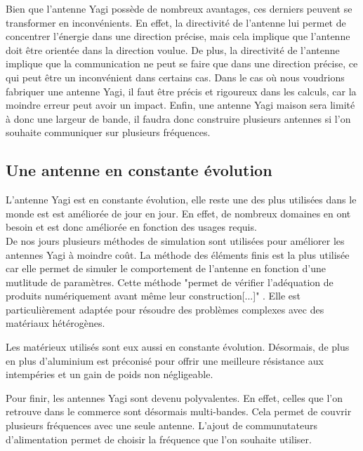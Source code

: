 \documentclass[12pt, a4paper]{article}
\begin{document}
Bien que l'antenne Yagi possède de nombreux avantages, ces derniers
peuvent se transformer en inconvénients. En effet, la directivité de l'antenne
lui permet de concentrer l'énergie dans une direction
précise, mais cela implique que l'antenne doit être
orientée dans la direction voulue. De plus, la directivité
de l'antenne implique que la communication ne peut se faire
que dans une direction précise, ce qui peut être un inconvénient
dans certains cas. Dans le cas où nous voudrions fabriquer
une antenne Yagi, il faut être précis et rigoureux dans
les calculs, car la moindre erreur peut avoir un impact. 
Enfin, une antenne Yagi maison sera limité à donc une
largeur de bande, il faudra donc construire plusieurs antennes
si l'on souhaite communiquer sur plusieurs fréquences.\\

\subsection{Une antenne en constante évolution}
L'antenne Yagi est en constante évolution, elle reste 
une des plus utilisées dans le monde est 
est améliorée de jour en jour. En effet, de nombreux 
domaines en ont besoin et est donc améliorée en
fonction des usages requis.\\

De nos jours plusieurs méthodes de simulation
sont utilisées pour améliorer les antennes Yagi à moindre
coût. La méthode des éléments finis est la plus utilisée
car elle permet de simuler le comportement de l'antenne
en fonction d'une mutlitude de paramètres. Cette méthode 
"permet de vérifier l'adéquation de produits 
numériquement avant même leur construction[...]" \cite{r3}.
Elle est particulièrement adaptée pour 
résoudre des problèmes complexes avec des matériaux 
hétérogènes.

Les matérieux utilisés sont eux aussi en constante 
évolution. Désormais, de plus en plus d'aluminium 
est préconisé pour offrir une meilleure résistance 
aux intempéries et un gain de poids non négligeable.

Pour finir, les antennes Yagi sont devenu polyvalentes.
En effet, celles que l'on retrouve dans le commerce
sont désormais multi-bandes. Cela permet de couvrir
plusieurs fréquences avec une seule antenne. L'ajout
de communutateurs d'alimentation permet de choisir
la fréquence que l'on souhaite utiliser.\\
\end{document}
